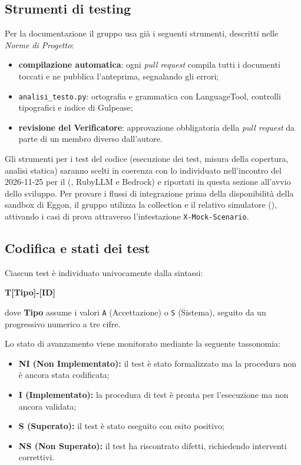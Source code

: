 \documentclass[documento]{gpt}
\begin{document}
\subsection{Strumenti di testing}
Per la documentazione il gruppo usa già i seguenti strumenti, descritti nelle \textit{Norme di Progetto}:
\begin{itemize}
    \item \textbf{compilazione automatica}: ogni \textit{pull request} compila tutti i documenti toccati e ne pubblica l'anteprima, segnalando gli errori;
    \item \texttt{analisi\_testo.py}: ortografia e grammatica con LanguageTool, controlli tipografici e indice di Gulpease;
    \item \textbf{revisione del Verificatore}: approvazione obbligatoria della \textit{pull request} da parte di un membro diverso dall'autore.
\end{itemize}
Gli strumenti per i test del codice (esecuzione dei test, misura della copertura, analisi statica) saranno scelti in coerenza con lo  individuato nell'incontro del 2026-11-25 per il  (, RubyLLM e  Bedrock) e riportati in questa sezione all'avvio dello sviluppo. Per provare i flussi di integrazione prima della disponibilità della sandbox di Eggon, il gruppo utilizza la collection  e il relativo simulatore (), attivando i casi di prova attraverso l'intestazione \texttt{X-Mock-Scenario}.

\subsection{Codifica e stati dei test}
Ciascun test è individuato univocamente dalla sintassi:
\begin{center}
\textbf{T[Tipo]-[ID]}
\end{center}
dove \textbf{Tipo} assume i valori \texttt{A} (Accettazione) o \texttt{S} (Sistema), seguito da un progressivo numerico a tre cifre.

Lo stato di avanzamento viene monitorato mediante la seguente tassonomia:
\begin{itemize}
    \item \textbf{NI (Non Implementato):} il test è stato formalizzato ma la procedura non è ancora stata codificata;
    \item \textbf{I (Implementato):} la procedura di test è pronta per l'esecuzione ma non ancora validata;
    \item \textbf{S (Superato):} il test è stato eseguito con esito positivo;
    \item \textbf{NS (Non Superato):} il test ha riscontrato difetti, richiedendo interventi correttivi.
\end{itemize}
\end{document}
